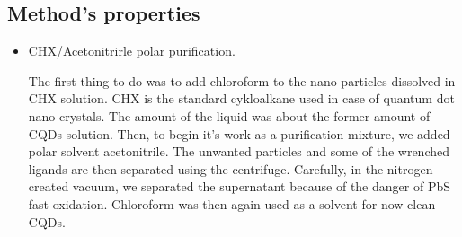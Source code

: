 \subsection{Method's properties}
\label{subsection:CHXpurification}
\begin{itemize}
\item CHX/Acetonitrirle polar purification.


The first thing to do was to add chloroform to the nano-particles dissolved in CHX solution. CHX is the standard cykloalkane used in case of quantum dot nano-crystals. The amount of the liquid was about the former amount of CQDs solution. Then, to begin it's work as a purification mixture, we added polar solvent acetonitrile. The unwanted particles and some of the wrenched ligands are then separated using the centrifuge. Carefully, in the nitrogen created vacuum, we separated the supernatant because of the danger of PbS fast oxidation. Chloroform was then again used as a solvent for now clean CQDs.

\end{itemize}
